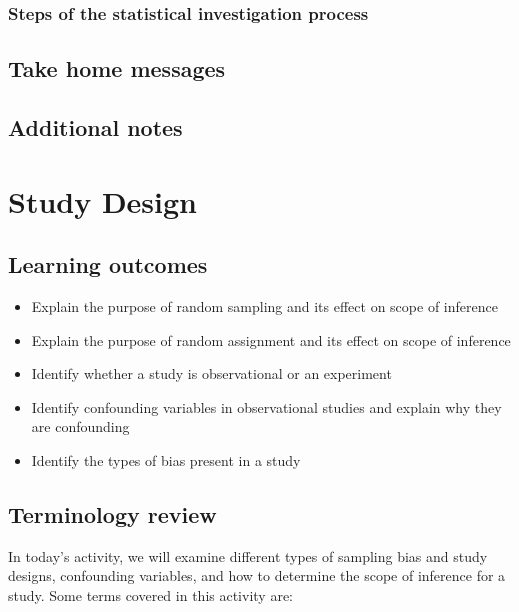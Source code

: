 \documentclass[
]{report}
\begin{document}
\hypertarget{steps-of-the-statistical-investigation-process}{%
\subsection{Steps of the statistical investigation process}\label{steps-of-the-statistical-investigation-process}}

\hypertarget{take-home-messages}{%
\section{Take home messages}\label{take-home-messages}}

\hypertarget{additional-notes}{%
\section{Additional notes}\label{additional-notes}}

\hypertarget{study-design}{%
\chapter{Study Design}\label{study-design}}

\hypertarget{learning-outcomes}{%
\section{Learning outcomes}\label{learning-outcomes}}

\begin{itemize}
\item
  Explain the purpose of random sampling and its effect on scope of inference
\item
  Explain the purpose of random assignment and its effect on scope of inference
\item
  Identify whether a study is observational or an experiment
\item
  Identify confounding variables in observational studies and explain why they are confounding
\item
  Identify the types of bias present in a study
\end{itemize}

\hypertarget{terminology-review}{%
\section{Terminology review}\label{terminology-review}}

In today's activity, we will examine different types of sampling bias and study designs, confounding variables, and how to determine the scope of inference for a study. Some terms covered in this activity are:
\end{document}
